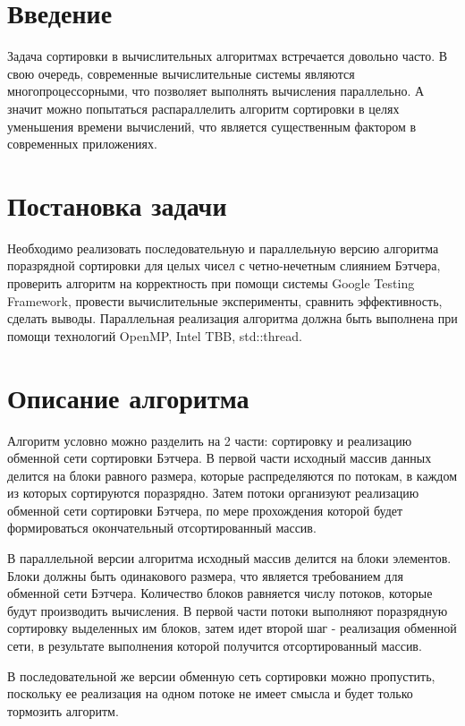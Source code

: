 \documentclass{report}
\begin{document}
\setcounter{page}{2}

\tableofcontents
\newpage

\section*{Введение}
\par Задача сортировки в вычислительных алгоритмах встречается довольно часто. В свою очередь, современные вычислительные системы являются многопроцессорными, что позволяет выполнять вычисления параллельно. А значит можно попытаться распараллелить алгоритм сортировки в целях уменьшения времени вычислений, что является существенным фактором в современных приложениях.
\newpage

\section*{Постановка задачи}
\par Необходимо реализовать последовательную и параллельную версию алгоритма поразрядной сортировки для целых чисел с четно-нечетным слиянием Бэтчера, проверить алгоритм на корректность при помощи системы Google Testing Framework, провести вычислительные эксперименты, сравнить эффективность, сделать выводы. Параллельная реализация алгоритма должна быть выполнена при помощи технологий OpenMP, Intel TBB, std::thread.
\newpage

\section*{Описание алгоритма}
\par Алгоритм условно можно разделить на 2 части: сортировку и реализацию обменной сети сортировки Бэтчера. В первой части исходный массив данных делится на блоки равного размера, которые распределяются по потокам, в каждом из которых сортируются поразрядно. Затем потоки организуют реализацию обменной сети сортировки Бэтчера, по мере прохождения которой будет формироваться окончательный отсортированный массив. 
\par В параллельной версии алгоритма исходный массив делится на блоки элементов. Блоки должны быть одинакового размера, что является требованием для обменной сети Бэтчера. Количество блоков равняется числу потоков, которые будут производить вычисления. В первой части потоки выполняют поразрядную сортировку выделенных им блоков, затем идет второй шаг - реализация обменной сети, в результате выполнения которой получится отсортированный массив.
\par В последовательной же версии обменную сеть сортировки можно пропустить, поскольку ее реализация на одном потоке не имеет смысла и будет только тормозить алгоритм.
\end{document}
